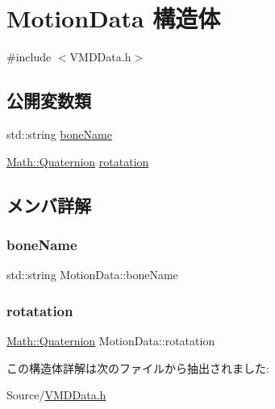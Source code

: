 \hypertarget{struct_motion_data}{}\section{Motion\+Data 構造体}
\label{struct_motion_data}


{\ttfamily \#include $<$V\+M\+D\+Data.\+h$>$}

\subsection*{公開変数類}
\begin{DoxyCompactItemize}
\item 
std\+::string \mbox{\hyperlink{struct_motion_data_a8ba5613222d6c8c992c39054d18e45bf}{bone\+Name}}
\item 
\mbox{\hyperlink{struct_math_1_1_quaternion}{Math\+::\+Quaternion}} \mbox{\hyperlink{struct_motion_data_a3d7d9b2353a078cd45768fce3851ef70}{rotatation}}
\end{DoxyCompactItemize}


\subsection{メンバ詳解}
\mbox{\label{struct_motion_data_a8ba5613222d6c8c992c39054d18e45bf}} 
\subsubsection{\texorpdfstring{bone\+Name}{boneName}}
{\footnotesize\ttfamily std\+::string Motion\+Data\+::bone\+Name}

\mbox{\label{struct_motion_data_a3d7d9b2353a078cd45768fce3851ef70}} 
\subsubsection{\texorpdfstring{rotatation}{rotatation}}
{\footnotesize\ttfamily \mbox{\hyperlink{struct_math_1_1_quaternion}{Math\+::\+Quaternion}} Motion\+Data\+::rotatation}



この構造体詳解は次のファイルから抽出されました\+:\begin{DoxyCompactItemize}
\item 
Source/\mbox{\hyperlink{_v_m_d_data_8h}{V\+M\+D\+Data.\+h}}\end{DoxyCompactItemize}
